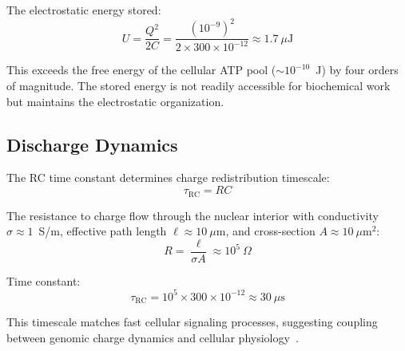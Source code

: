 \documentclass[twocolumn,aps,prb,superscriptaddress,longbibliography,floatfix]{revtex4-2}
\theoremstyle{remark}
\begin{document}
The electrostatic energy stored:
\begin{equation}
U = \frac{Q^2}{2C} = \frac{(10^{-9})^2}{2 \times 300 \times 10^{-12}} \approx 1.7~\mu\text{J}
\label{eq:stored_energy}
\end{equation}

This exceeds the free energy of the cellular ATP pool
($\sim 10^{-10}$~J) by four orders of magnitude. The stored energy is
not readily accessible for biochemical work but maintains the
electrostatic organization.

\subsection{Discharge Dynamics}

The RC time constant determines charge redistribution timescale:
\begin{equation}
\tau_\text{RC} = RC
\end{equation}

The resistance to charge flow through the nuclear interior with
conductivity $\sigma \approx 1$~S/m, effective path length
$\ell \approx 10~\mu$m, and cross-section $A \approx 10~\mu\text{m}^2$:
\begin{equation}
R = \frac{\ell}{\sigma A} \approx 10^5~\Omega
\end{equation}

Time constant:
\begin{equation}
\tau_\text{RC} = 10^5 \times 300 \times 10^{-12} \approx 30~\mu\text{s}
\end{equation}

This timescale matches fast cellular signaling processes, suggesting
coupling between genomic charge dynamics and cellular
physiology~\cite{Bhalla1999}.
\end{document}
